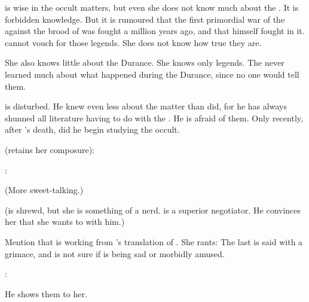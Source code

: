\Urizeth is wise in the occult matters, but even she does not know much about the \SitraAchras.
It is forbidden knowledge. 
But it is rumoured that the first primordial war of the \SitraAchras against the brood of \Sethicus was fought a million years ago, and that \Ishnaruchaefir himself fought in it. 
\Urizeth cannot vouch for those legends. 
She does not know how true they are. 

She also knows little about the Durance. 
She knows only legends. 
The \resphain never learned much about what happened during the Durance, since no one would tell them. 

\Teshrial is disturbed.
He knew even less about the matter than \Urizeth did, for he has always shunned all literature having to do with the \SitraAchras.
He is afraid of them. 
Only recently, after \Urizeth's death, did he begin studying the occult. 


\Urizeth (retains her composure):  

\Teshrial: 

(More sweet-talking.)

(\Urizeth is shrewd, but she is something of a nerd. \Teshrial is a superior negotiator. He convinces her that she wants to \cooperate with him.) 

Mention that \Urizeth is working from \Essenai's translation of \WanderersInDarknessEmph. 
She rants:
The last is said with a grimace, and \Teshrial is not sure if \Urizeth is being sad or morbidly amused. 



\begin{comment}
  \section{Lothagiel's notes}
\end{comment}

\Urizeth:

He shows them to her.

